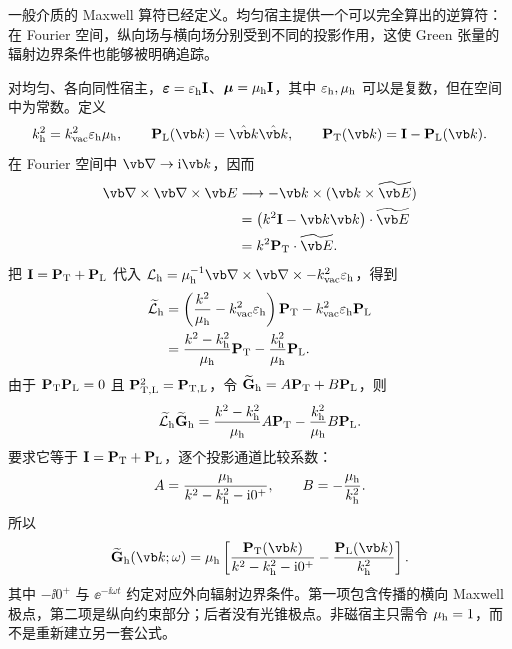 一般介质的 Maxwell 算符已经定义。均匀宿主提供一个可以完全算出的逆算符：在 Fourier 空间，纵向场与横向场分别受到不同的投影作用，这使 Green 张量的辐射边界条件也能够被明确追踪。


对均匀、各向同性宿主，$\boldsymbol\varepsilon=\varepsilon_{\rm h}\mathbf I$、$\boldsymbol\mu=\mu_{\rm h}\mathbf I$，其中 $\varepsilon_{\rm h},\mu_{\rm h}$ 可以是复数，但在空间中为常数。定义
\begin{equation}
 k_{\rm h}^2=k_{\rm vac}^2\varepsilon_{\rm h}\mu_{\rm h},
 \qquad
 \mathbf P_{\rm L}(\vb k)=\hat{\vb k}\hat{\vb k},
 \qquad
 \mathbf P_{\rm T}(\vb k)=\mathbf I-\mathbf P_{\rm L}(\vb k).
 \label{eq:LT-projectors}
\end{equation}
在 Fourier 空间中 $\vb\nabla\to\ii\vb k$，因而
\begin{align}
\vb\nabla\times\vb\nabla\times\vb E
&\longrightarrow
-\vb k\times(\vb k\times\widetilde{\vb E})\\
&=\left(k^2\mathbf I-\vb k\vb k\right)\cdot\widetilde{\vb E}\\
&=k^2\mathbf P_{\rm T}\cdot\widetilde{\vb E}.
\end{align}
把 $\mathbf I=\mathbf P_{\rm T}+\mathbf P_{\rm L}$ 代入
$\mathcal L_{\rm h}=\mu_{\rm h}^{-1}\vb\nabla\times\vb\nabla\times-k_{\rm vac}^2\varepsilon_{\rm h}$，得到
\begin{align}
\widetilde{\mathcal L}_{\rm h}
&=\left(\frac{k^2}{\mu_{\rm h}}-k_{\rm vac}^2\varepsilon_{\rm h}\right)\mathbf P_{\rm T}
-k_{\rm vac}^2\varepsilon_{\rm h}\mathbf P_{\rm L}\\
&=\frac{k^2-k_{\rm h}^2}{\mu_{\rm h}}\mathbf P_{\rm T}
-\frac{k_{\rm h}^2}{\mu_{\rm h}}\mathbf P_{\rm L}.
\label{eq:maxwell-LT-decomposition}
\end{align}
由于 $\mathbf P_{\rm T}\mathbf P_{\rm L}=0$ 且 $\mathbf P_{\rm T,L}^2=\mathbf P_{\rm T,L}$，令
$\widetilde{\mathbf G}_{\rm h}=A\mathbf P_{\rm T}+B\mathbf P_{\rm L}$，则
\begin{equation}
\widetilde{\mathcal L}_{\rm h}\widetilde{\mathbf G}_{\rm h}
=\frac{k^2-k_{\rm h}^2}{\mu_{\rm h}}A\mathbf P_{\rm T}
-\frac{k_{\rm h}^2}{\mu_{\rm h}}B\mathbf P_{\rm L}.
\end{equation}
要求它等于 $\mathbf I=\mathbf P_{\rm T}+\mathbf P_{\rm L}$，逐个投影通道比较系数：
\begin{equation}
 A=\frac{\mu_{\rm h}}{k^2-k_{\rm h}^2-\mathrm{i}0^+},
 \qquad
 B=-\frac{\mu_{\rm h}}{k_{\rm h}^2}.
\end{equation}
所以
\begin{equation}
 {
 \widetilde{\mathbf G}_{\rm h}(\vb k;\omega)
 =\mu_{\rm h}\left[
 \frac{\mathbf P_{\rm T}(\vb k)}{k^2-k_{\rm h}^2-\ii0^+}
 -\frac{\mathbf P_{\rm L}(\vb k)}{k_{\rm h}^2}
 \right].}
 \label{eq:homogeneous-green-k}
\end{equation}
其中 $-\ii0^+$ 与 $\ee^{-\ii\omega t}$ 约定对应外向辐射边界条件。第一项包含传播的横向 Maxwell 极点，第二项是纵向约束部分；后者没有光锥极点。非磁宿主只需令 $\mu_{\rm h}=1$，而不是重新建立另一套公式。

